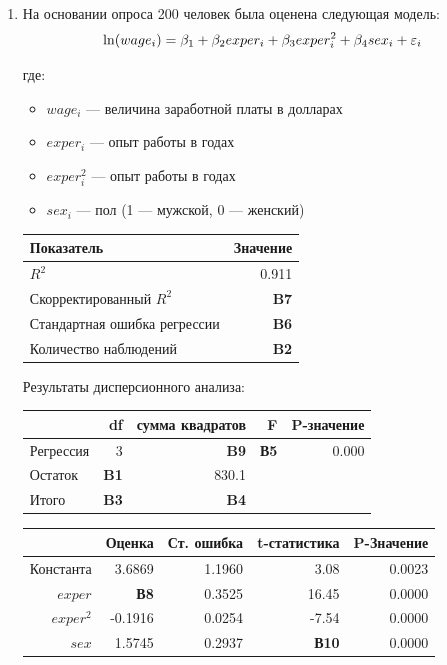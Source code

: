 \documentclass[12pt, a4paper]{article}\usepackage[]{graphicx}\usepackage[]{color}
\begin{document}



\begin{enumerate}



\item На основании опроса 200 человек была оценена следующая модель:
\[
\ln(wage_i)=\beta_1 + \beta_2 exper_i + \beta_3 exper^2_i + \beta_4 sex_i + \varepsilon_i
\]

где:
\begin{itemize}
\item $wage_i$ — величина заработной платы в долларах
\item $exper_i$ — опыт работы в годах
\item $exper^2_i$ — опыт работы в годах
\item $sex_i$ — пол (1 — мужской, 0 — женский)
\end{itemize}

\begin{tabular}{lr} \toprule
Показатель & Значение \\
\midrule
$R^2$                        & 0.911 \\
Скорректированный $R^2$      & \textbf{B7} \\
Стандартная ошибка регрессии & \textbf{B6} \\
Количество наблюдений        & \textbf{B2} \\
\bottomrule
\end{tabular}

Результаты дисперсионного анализа:

\begin{tabular}{lrrrr} \toprule
            &  df           & сумма квадратов & F           & P-значение \\
\midrule
Регрессия   & 3            & \textbf{B9}     & \textbf{В5}  & 0.000 \\
Остаток     & \textbf{B1}  &  830.1          &              &       \\
Итого       & \textbf{B3}  & \textbf{B4}     &              &       \\
\bottomrule
\end{tabular}


\begin{table}[ht]
\centering
\begin{tabular}{rrrrr}
  \hline
 & Оценка & Ст. ошибка & t-статистика & P-Значение \\
  \hline
Константа & 3.6869 & 1.1960 & 3.08 & 0.0023 \\
  $exper$ & \textbf{В8} & 0.3525 & 16.45 & 0.0000 \\
  $exper^2$ & -0.1916 & 0.0254 & -7.54 & 0.0000 \\
  $sex$ & 1.5745 & 0.2937 & \textbf{В10} & 0.0000 \\
   \hline
\end{tabular}
\end{table}




\end{enumerate}
\end{document}
